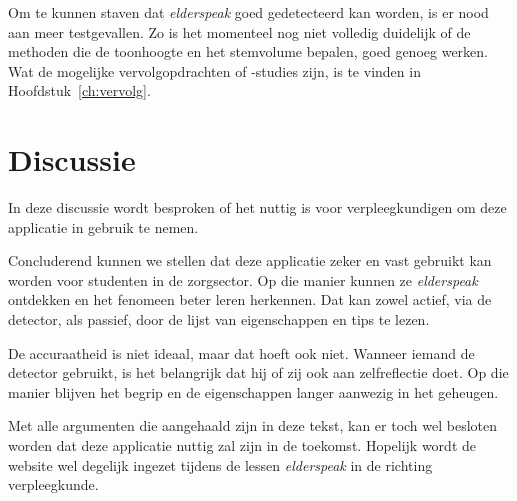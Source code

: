 Om te kunnen staven dat \textit{elderspeak} goed gedetecteerd kan worden, is er nood aan meer testgevallen. Zo is het momenteel nog niet volledig duidelijk of de methoden die de toonhoogte en het stemvolume bepalen, goed genoeg werken. Wat de mogelijke vervolgopdrachten of -studies zijn, is te vinden in Hoofdstuk~\ref{ch:vervolg}.

\section{Discussie}
In deze discussie wordt besproken of het nuttig is voor verpleegkundigen om deze applicatie in gebruik te nemen.

Concluderend kunnen we stellen dat deze applicatie zeker en vast gebruikt kan worden voor studenten in de zorgsector. Op die manier kunnen ze \textit{elderspeak} ontdekken en het fenomeen beter leren herkennen. Dat kan zowel actief, via de detector, als passief, door de lijst van eigenschappen en tips te lezen.

De accuraatheid is niet ideaal, maar dat hoeft ook niet. Wanneer iemand de detector gebruikt, is het belangrijk dat hij of zij ook aan zelfreflectie doet. Op die manier blijven het begrip en de eigenschappen langer aanwezig in het geheugen.

Met alle argumenten die aangehaald zijn in deze tekst, kan er toch wel besloten worden dat deze applicatie nuttig zal zijn in de toekomst. Hopelijk wordt de website wel degelijk ingezet tijdens de lessen \textit{elderspeak} in de richting verpleegkunde.